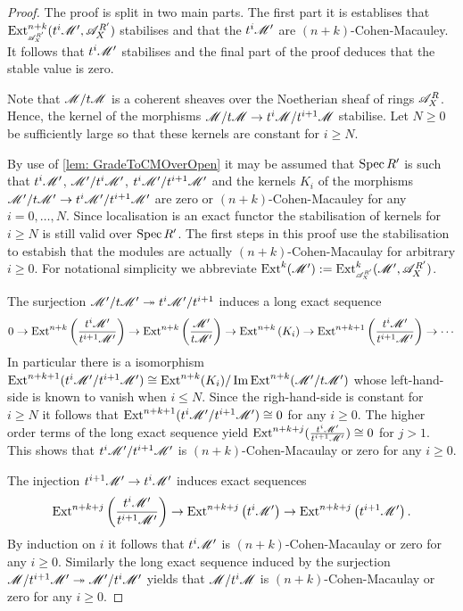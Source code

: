 \begin{proof}
  The proof is split in two main parts. The first part it is establises that $\Ex{\A_X^{R'}}{n+k}(t^i\M',\ab\A_X^{R'})$ stabilises and that the $t^i\mathscr{M}'$ are $(n+k)$-Cohen-Macauley. It follows that $t^i\mathscr{M}'$ stabilises and the final part of the proof deduces that the stable value is zero.

  Note that $\mathscr{M}/t\mathscr{M}$ is a coherent sheaves over the Noetherian sheaf of rings $\mathscr{A}_X^R$.
  Hence, the kernel of the morphisms $\mathscr{M}/t\mathscr{M} \to t^i\mathscr{M} / t^{i+1}\mathscr{M}$ stabilise.
  Let $N\geq 0$ be sufficiently large so that these kernels are constant for $i\geq N$.

  By use of \cref{lem: GradeToCMOverOpen} it may be assumed that $\operatorname{Spec} R'$ is such that $t^i\mathscr{M}'$, $\mathscr{M}'/t^{i}\mathscr{M}'$, $t^i\mathscr{M}'/t^{i+1}\mathscr{M}'$ and the kernels $K_i$ of the morphisms $\mathscr{M}'/t\mathscr{M}' \to t^i \mathscr{M}'/ t^{i+1} \mathscr{M}'$ are zero or $(n+k)$-Cohen-Macauley for any $i=0,\ldots,N$.
  Since localisation is an exact functor the stabilisation of kernels for $i\geq N$ is still valid over $\operatorname{Spec} R'$.
  The first steps in this proof use the stabilisation to estabish that the modules are actually $(n+k)$-Cohen-Macaulay for arbitrary $i\geq 0$. For notational simplicity we abbreviate $\Ext^{k}(\M') :=\Ex{\A_X^{R'}}{k}(\M',\A_X^{R'})$.

  The surjection $\mathscr{M}'/t\mathscr{M}' \twoheadrightarrow t^i \mathscr{M}'/t^{i+1}$ induces a long exact sequence
  $$0 \to \operatorname{Ext}^{n+k}\left(\frac{t^i\mathscr{M}'}{ t^{i+1}\mathscr{M}'}\right) \to  \operatorname{Ext}^{n+k}\left(\frac{\mathscr{M}'}{t\mathscr{M}'}\right) \to \operatorname{Ext}^{n+k}\left(K_i\right) \to \operatorname{Ext}^{n+k+1}\left(\frac{t^i\mathscr{M}'}{ t^{i+1}\mathscr{M}'}\right)\to \cdots $$
  In particular there is a isomorphism $\operatorname{Ext}^{n+k+1}(t^i\mathscr{M}'/t^{i+1}\mathscr{M}') \cong \operatorname{Ext}^{n+k}(K_i)\allowbreak/\operatorname{Im} \operatorname{Ext}^{n+k}(\mathscr{M}'\allowbreak /t\mathscr{M}')$ whose left-hand-side is known to vanish when $i\leq N$.
  Since the righ-hand-side is constant for $i\geq N$ it follows that $\operatorname{Ext}^{n+k+1}(t^i\mathscr{M}'/t^{i+1}\mathscr{M}')\cong 0$ for any $i\geq 0$.
  The higher order terms of the long exact sequence yield $\operatorname{Ext}^{n+k+j}(\frac{t^i\mathscr{M}'}{ t^{i+1}\mathscr{M}'}) \cong 0$ for $j>1$.
  This shows that $t^i \mathscr{M}'/t^{i+1}\mathscr{M}'$ is $(n+k)$-Cohen-Macaulay or zero for any $i\geq 0$.


  The injection $t^{i+1} \mathscr{M}'\to t^{i}\mathscr{M}'$ induces exact sequences
  $$\operatorname{Ext}^{n+k+j}\left(\frac{t^i\mathscr{M}'}{ t^{i+1}\mathscr{M}'}\right) \to  \operatorname{Ext}^{n+k+j}\left(t^{i}\mathscr{M}'\right) \to \operatorname{Ext}^{n+k +j}\left(t^{i+1} \mathscr{M}'\right).$$
  By induction on $i$ it follows that $t^i\mathscr{M}'$ is $(n+k)$-Cohen-Macaulay or zero for any $i\geq 0$.
  Similarly the long exact sequence induced by the surjection $\mathscr{M}/t^{i+1}\mathscr{M}' \twoheadrightarrow \mathscr{M}'/t^{i}\mathscr{M}'$ yields that $\mathscr{M}/t^{i}\mathscr{M}$ is $(n+k)$-Cohen-Macaulay or zero for any $i\geq 0$.



\end{proof}
